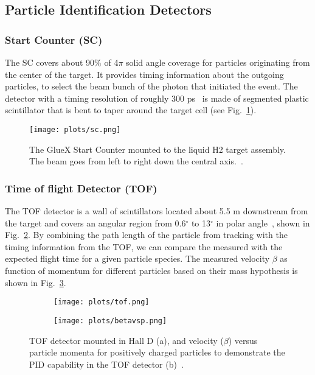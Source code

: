 {\subsection{Particle Identification Detectors}
\label{p.2.2.1}

\subsubsection{Start Counter (SC)}
The SC covers about 90$\%$ of 4$\pi$ solid angle coverage for particles originating from the center of the target. It provides timing information about the outgoing particles, to select the beam bunch of the photon that initiated the event. The detector with a timing resolution of roughly 300 ps~\cite{GlueX97} is made of segmented plastic scintillator that is bent to taper around the target cell (see Fig.~\ref{fig.2.2.1.1}).

\begin{figure}[H]
    \centering
        \texttt{[image: plots/sc.png]}
        \caption{The GlueX Start Counter mounted to the liquid H2 target assembly. The beam goes from left to right down the central axis.~\cite{GlueX97}.}
        \label{fig.2.2.1.1}
\end{figure}

\subsubsection{Time of flight Detector (TOF)}
The TOF detector is a wall of scintillators located about 5.5 m downstream from the target and covers an angular region from 0.6$^{\circ}$ to 13$^{\circ}$ in polar angle~\cite{GlueX97}, shown in Fig.~\ref{fig.2.2.1.2.a}. By combining the path length of the particle from tracking with the timing information from the TOF, we can compare the measured with the expected flight time for a given particle species. The measured velocity $\beta$ as function of momentum for different particles based on their mass hypothesis is shown in Fig.~\ref{fig.2.2.1.2.b}.

\begin{figure}[H]
    \centering
    \begin{subfigure}[H]{0.5\textwidth}
        \texttt{[image: plots/tof.png]}
        \caption{}
        \label{fig.2.2.1.2.a}
    \end{subfigure}\vfill
    \begin{subfigure}[H]{0.6\textwidth}
        \texttt{[image: plots/betavsp.png]}
        \caption{}
        \label{fig.2.2.1.2.b}
        \vspace{1pt}
    \end{subfigure}
    \caption{TOF detector mounted in Hall D (a), and velocity ($\beta$) versus particle momenta for positively charged particles to demonstrate the PID capability in the TOF detector (b)~\cite{Ghoul16}.}
    \label{fig.4.2.2}
\end{figure}

}

